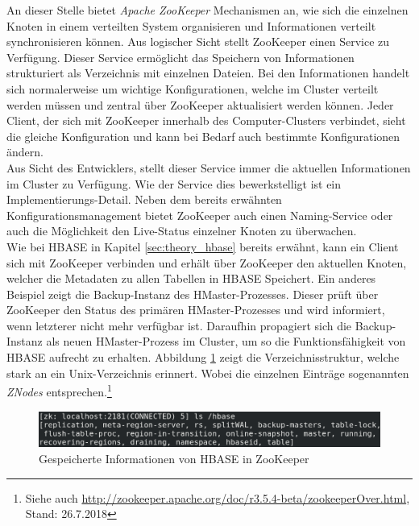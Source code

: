 \noindent
An dieser Stelle bietet \textit{Apache ZooKeeper\texttrademark\thinspace} Mechanismen an, wie sich die einzelnen Knoten in einem verteilten System organisieren und Informationen verteilt synchronisieren können. Aus logischer Sicht stellt ZooKeeper einen Service zu Verfügung. Dieser Service ermöglicht das Speichern von Informationen strukturiert als Verzeichnis mit einzelnen Dateien. Bei den Informationen handelt sich normalerweise um wichtige Konfigurationen, welche im Cluster verteilt werden müssen und zentral über ZooKeeper aktualisiert werden können. Jeder Client, der sich mit ZooKeeper innerhalb des Computer-Clusters verbindet, sieht die gleiche Konfiguration und kann bei Bedarf auch bestimmte Konfigurationen ändern.\cite[S. 4 ff]{professional_hadoop} \\
Aus Sicht des Entwicklers, stellt dieser Service immer die aktuellen Informationen im Cluster zu Verfügung. Wie der Service dies bewerkstelligt ist ein Implementierungs-Detail. Neben dem bereits erwähnten Konfigurationsmanagement bietet ZooKeeper auch einen Naming-Service oder auch die Möglichkeit den Live-Status einzelner Knoten zu überwachen.\cite{zookeeper_essentials}\\
Wie bei HBASE in Kapitel \ref{sec:theory_hbase} bereits erwähnt, kann ein Client sich mit ZooKeeper verbinden und erhält über ZooKeeper den aktuellen Knoten, welcher die Metadaten zu allen Tabellen in HBASE Speichert. Ein anderes Beispiel zeigt die Backup-Instanz des HMaster-Prozesses. Dieser prüft über ZooKeeper den Status des primären HMaster-Prozesses und wird informiert, wenn letzterer nicht mehr verfügbar ist. Daraufhin propagiert sich die Backup-Instanz als neuen HMaster-Prozess im Cluster, um so die Funktionsfähigkeit von HBASE aufrecht zu erhalten. Abbildung \ref{fig:zookeeper_dir} zeigt die Verzeichnisstruktur, welche stark an ein Unix-Verzeichnis erinnert. Wobei die einzelnen Einträge sogenannten \textit{ZNodes} entsprechen.\footnote{Siehe auch \url{http://zookeeper.apache.org/doc/r3.5.4-beta/zookeeperOver.html}, Stand: 26.7.2018} \\

\begin{figure}[ht]
  \centering
  \includegraphics[width=\textwidth]{./resource/zookeeper_dir.png}
  \caption{Gespeicherte Informationen von HBASE in ZooKeeper}
  \label{fig:zookeeper_dir}
\end{figure}


